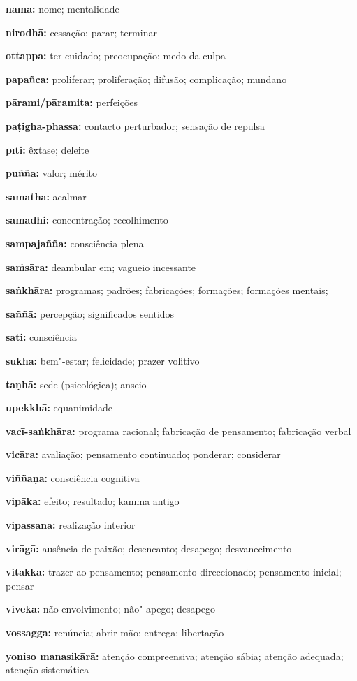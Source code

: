 {\textbf{nāma:} nome; mentalidade

\textbf{nirodhā:} cessação; parar; terminar

\textbf{ottappa:} ter cuidado; preocupação; medo da culpa

\textbf{papañca:} proliferar; proliferação; difusão; complicação; mundano

\textbf{pārami/pāramita:} perfeições

\textbf{paṭigha-phassa:} contacto perturbador; sensação de repulsa

\textbf{pīti:} êxtase; deleite

\textbf{puñña:} valor; mérito

\textbf{samatha:} acalmar

\textbf{samādhi:} concentração; recolhimento

\textbf{sampajañña:} consciência plena

\textbf{saṁsāra:} deambular em; vagueio incessante

\textbf{saṅkhāra:} programas; padrões; fabricações; formações; formações mentais;

\textbf{saññā:} percepção; significados sentidos

\textbf{sati:} consciência

\textbf{sukhā:} bem"-estar; felicidade; prazer volitivo

\textbf{taṇhā:} sede (psicológica); anseio

\textbf{upekkhā:} equanimidade

\textbf{vacī-saṅkhāra:} programa racional; fabricação de pensamento; fabricação verbal

\textbf{vicāra:} avaliação; pensamento continuado; ponderar; considerar

\textbf{viññaṇa:} consciência cognitiva

\textbf{vipāka:} efeito; resultado; kamma antigo

\textbf{vipassanā:} realização interior

\textbf{virāgā:} ausência de paixão; desencanto; desapego; desvanecimento

\textbf{vitakkā:} trazer ao pensamento; pensamento direccionado; pensamento inicial; pensar

\textbf{viveka:} não envolvimento; não"-apego; desapego

\textbf{vossagga:} renúncia; abrir mão; entrega; libertação

\textbf{yoniso manasikārā:} atenção compreensiva; atenção sábia; atenção adequada; atenção sistemática

\setlength{\parskip}{5pt}

}
